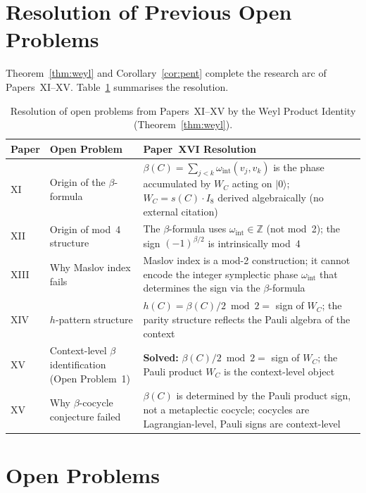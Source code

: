 \documentclass[11pt,a4paper]{article}
\theoremstyle{remark}
\begin{document}
\section{Resolution of Previous Open Problems}\label{sec:resolution}

Theorem~\ref{thm:weyl} and Corollary~\ref{cor:pent} complete the
research arc of Papers~XI--XV.
Table~\ref{tab:resolution} summarises the resolution.

\begin{table}[H]
\centering
\caption{Resolution of open problems from Papers~XI--XV by the Weyl
Product Identity (Theorem~\ref{thm:weyl}).}
\label{tab:resolution}
\begin{tabular}{p{1.4cm}p{5.2cm}p{5.2cm}}
\toprule
Paper & Open Problem & Paper~XVI Resolution \\
\midrule
XI & Origin of the $\beta$-formula
    & $\beta(C) = \sum_{j<k}\omega_{\mathrm{int}}(v_j,v_k)$ is the
      phase accumulated by $W_C$ acting on $|0\rangle$;
      $W_C = s(C)\cdot I_8$ derived algebraically (no external citation) \\
\addlinespace
XII & Origin of mod~4 structure
    & The $\beta$-formula uses $\omega_{\mathrm{int}} \in \mathbb{Z}$
      (not mod~2); the sign $(-1)^{\beta/2}$ is intrinsically mod~4 \\
\addlinespace
XIII & Why Maslov index fails
    & Maslov index is a mod-2 construction; it cannot encode the
      integer symplectic phase $\omega_{\mathrm{int}}$ that determines
      the sign via the $\beta$-formula \\
\addlinespace
XIV & $h$-pattern structure
    & $h(C) = \beta(C)/2 \bmod 2 = $ sign of $W_C$;
      the parity structure reflects the Pauli algebra of the context \\
\addlinespace
XV  & Context-level $\beta$ identification
     (Open Problem~1)
    & \textbf{Solved:} $\beta(C)/2 \bmod 2 = $ sign of $W_C$;
      the Pauli product $W_C$ is the context-level object \\
\addlinespace
XV  & Why $\beta$-cocycle conjecture failed
    & $\beta(C)$ is determined by the Pauli product sign,
      not a metaplectic cocycle; cocycles are Lagrangian-level,
      Pauli signs are context-level \\
\bottomrule
\end{tabular}
\end{table}


\section{Open Problems}\label{sec:open}
\end{document}
